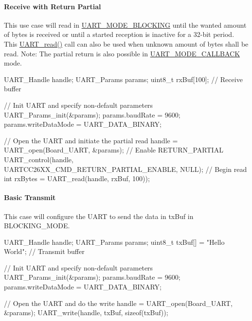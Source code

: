 \paragraph*{Receive with Return Partial}

This use case will read in \hyperlink{_u_a_r_t_8h_a2507a620dba95cd20885c52494d19e90ae6b6bd5d2d5df859ad6724e89e605ebf}{U\+A\+R\+T\+\_\+\+M\+O\+D\+E\+\_\+\+B\+L\+O\+C\+K\+I\+N\+G} until the wanted amount of bytes is received or until a started reception is inactive for a 32-\/bit period. This \hyperlink{_u_a_r_t_8h_a023152d57539cad94bdd813956013e73}{U\+A\+R\+T\+\_\+read()} call can also be used when unknown amount of bytes shall be read. Note\+: The partial return is also possible in \hyperlink{_u_a_r_t_8h_a2507a620dba95cd20885c52494d19e90ae0dbd9b5195e56c3c2aed10163523754}{U\+A\+R\+T\+\_\+\+M\+O\+D\+E\+\_\+\+C\+A\+L\+L\+B\+A\+C\+K} mode. 
\begin{DoxyCode}
UART_Handle handle;
UART_Params params;
uint8\_t rxBuf[100];      \textcolor{comment}{// Receive buffer}

\textcolor{comment}{// Init UART and specify non-default parameters}
UART_Params_init(&params);
params.baudRate      = 9600;
params.writeDataMode = UART_DATA_BINARY;

\textcolor{comment}{// Open the UART and initiate the partial read}
handle = UART_open(Board\_UART, &params);
\textcolor{comment}{// Enable RETURN\_PARTIAL}
UART_control(handle, UARTCC26XX_CMD_RETURN_PARTIAL_ENABLE, NULL);
\textcolor{comment}{// Begin read}
\textcolor{keywordtype}{int} rxBytes = UART_read(handle, rxBuf, 100));
\end{DoxyCode}


\paragraph*{Basic Transmit}

This case will configure the U\+A\+R\+T to send the data in tx\+Buf in B\+L\+O\+C\+K\+I\+N\+G\+\_\+\+M\+O\+D\+E. 
\begin{DoxyCode}
UART_Handle handle;
UART_Params params;
uint8\_t txBuf[] = \textcolor{stringliteral}{"Hello World"};    \textcolor{comment}{// Transmit buffer}

\textcolor{comment}{// Init UART and specify non-default parameters}
UART_Params_init(&params);
params.baudRate      = 9600;
params.writeDataMode = UART_DATA_BINARY;

\textcolor{comment}{// Open the UART and do the write}
handle = UART_open(Board\_UART, &params);
UART_write(handle, txBuf, \textcolor{keyword}{sizeof}(txBuf));
\end{DoxyCode}


